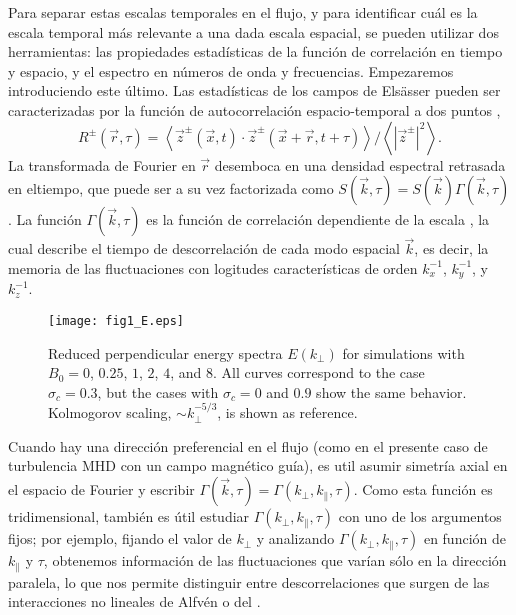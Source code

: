 Para separar estas escalas temporales en el flujo, y para identificar
cuál es la escala temporal más relevante a una dada escala espacial,
se pueden utilizar dos herramientas: las propiedades estadísticas de
la función de correlación en tiempo y espacio, y el espectro en
números de onda y frecuencias. Empezaremos introduciendo este
último. Las estadísticas de los campos de Els\"asser pueden ser
caracterizadas por la función de autocorrelación espacio-temporal a
dos puntos \cite{servidio_time_2011},
\begin{equation}
  R^\pm(\vec{r},\tau) = \left\langle \vec{z}^\pm( \vec{x},t) \cdot
    \vec{z} ^\pm( \vec{x} + \vec{r},t+\tau) \right\rangle \Big/ 
  \left\langle \left|{\vec{z}^\pm}\right|^2 \right\rangle.
  \label{eq:Rzij}
\end{equation}
La transformada de Fourier en $\vec{r}$ desemboca en una densidad
espectral retrasada en eltiempo, que puede ser a su vez factorizada
como $S(\vec{k},\tau) = S(\vec{k})\Gamma(\vec{k},\tau)$. La función
$\Gamma(\vec{k},\tau)$ es la función de correlación dependiente de la
escala \cite{heisenberg_zur_1948,
  comte-bellot_simple_1971,orszag_numerical_1972}, la cual describe el
tiempo de descorrelación de cada modo espacial $\vec{k}$, es decir, la
memoria de las fluctuaciones con logitudes características de orden
$k_x^{-1}$, $k_y^{-1}$, y $k_z^{-1}$.

\begin{figure}
\centering
\texttt{[image: fig1\_E.eps]}
\caption{Reduced perpendicular energy spectra $E(k_\perp)$ for
  simulations with $B_0=0$, $0.25$, $1$, $2$, $4$, and $8$. All curves
  correspond to the case $\sigma_c = 0.3$, but the cases with $\sigma_c = 0$ and
  $0.9$ show the same behavior. Kolmogorov scaling,
  $\sim k_\perp^{-5/3}$, is shown as reference.}
\label{fig1:E}
\end{figure}

Cuando hay una dirección preferencial en el flujo (como en el presente
caso de turbulencia MHD con un campo magnético guía), es util asumir
simetría axial en el espacio de Fourier y escribir
$\Gamma(\vec{k},\tau) = \Gamma(k_\perp,k_\parallel,\tau)$. Como esta
función es tridimensional, también es útil estudiar
$\Gamma(k_\perp,k_\parallel,\tau)$ con uno de los argumentos fijos;
por ejemplo, fijando el valor de $k_\perp$ y analizando
$\Gamma(k_\perp,k_\parallel,\tau)$ en función de $k_\parallel$ y
$\tau$, obtenemos información de las fluctuaciones que varían sólo en
la dirección paralela, lo que nos permite distinguir entre
descorrelaciones que surgen de las interacciones no lineales de Alfvén
o del \sweeping.

